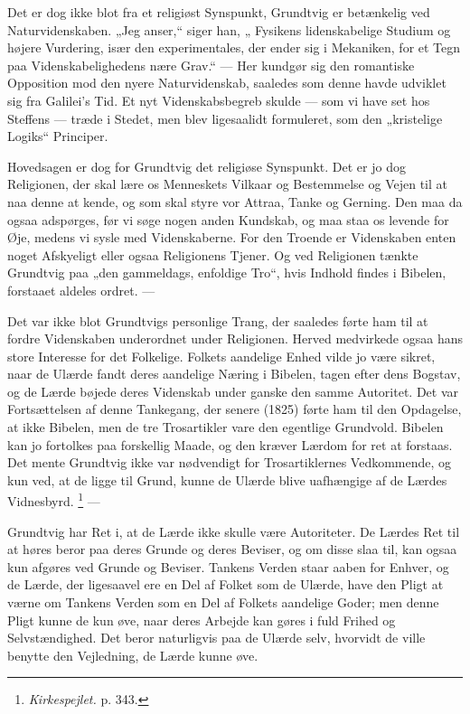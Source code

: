 \documentclass[12pt,a4paper,openany]{book}
\newcommand{\opage}[1]{\marginnote{\footnotesize\textit{[#1]}}}
\begin{document}
Det er dog ikke blot fra et religiøst Synspunkt, Grundtvig er betænkelig ved
Naturvidenskaben. „Jeg anser,“ siger han, „
\setcounter{footnote}{0}%
\opage{63}Fysikens lidenskabelige Studium og højere Vurdering, især den
experimentales, der ender sig i Mekaniken, for et Tegn paa Videnskabelighedens
nære Grav.“ --- Her kundgør sig den romantiske Opposition mod den nyere
Naturvidenskab, saaledes som denne havde udviklet sig fra Galilei's Tid. Et nyt
Videnskabsbegreb skulde --- som vi have set hos Steffens --- træde i Stedet,
men blev ligesaalidt formuleret, som den „kristelige Logiks“ Principer.

Hovedsagen er dog for Grundtvig det religiøse Synspunkt. Det er jo dog
Religionen, der skal lære os Menneskets Vilkaar og Bestemmelse og Vejen til at
naa denne at kende, og som skal styre vor Attraa, Tanke og Gerning. Den maa da
ogsaa adspørges, før vi søge nogen anden Kundskab, og maa staa os levende for
Øje, medens vi sysle med Videnskaberne. For den Troende er Videnskaben enten
noget Afskyeligt eller ogsaa Religionens Tjener. Og ved Religionen tænkte
Grundtvig paa „den gammeldags, enfoldige Tro“, hvis Indhold findes i Bibelen,
forstaaet aldeles ordret. ---

Det var ikke blot Grundtvigs personlige Trang, der saaledes førte ham til at
fordre Videnskaben underordnet under Religionen. Herved medvirkede ogsaa hans
store Interesse for det Folkelige. Folkets aandelige Enhed vilde jo være
sikret, naar de Ulærde fandt deres aandelige Næring i Bibelen, tagen efter dens
Bogstav, og de Lærde bøjede deres Videnskab under ganske den samme Autoritet.
Det var Fortsættelsen af denne Tankegang, der senere (1825) førte ham til den
Opdagelse, at ikke Bibelen, men de tre Trosartikler vare den egentlige
Grundvold. Bibelen kan jo fortolkes paa forskellig Maade, og den kræver Lærdom
for ret at forstaas. Det mente Grundtvig ikke var nødvendigt for
Trosartiklernes Vedkommende, og kun ved, at de ligge til Grund, kunne de Ulærde
blive uafhængige af de Lærdes Vidnesbyrd.%
\footnote[1]{\textit{Kirkespejlet.} p. 343.} ---

Grundtvig har Ret i, at de Lærde ikke skulle være Autoriteter. De Lærdes Ret
til at høres beror paa deres Grunde og deres Beviser, og om disse slaa til, kan
ogsaa kun afgøres ved Grunde og Beviser. Tankens Verden staar aaben for
\setcounter{footnote}{0}%
\opage{64}Enhver, og de Lærde, der ligesaavel ere en Del af Folket som de
Ulærde, have den Pligt at værne om Tankens Verden som en Del af Folkets
aandelige Goder; men denne Pligt kunne de kun øve, naar deres Arbejde kan gøres
i fuld Frihed og Selvstændighed. Det beror naturligvis paa de Ulærde selv,
hvorvidt de ville benytte den Vejledning, de Lærde kunne øve.
\end{document}
